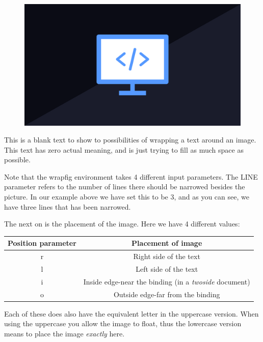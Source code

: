 \documentclass{article}
\begin{document}
\begin{figure}
    \centering
    \includegraphics[width=0.9\linewidth]{Images/Programming.png}
    \label{fig:image_wrap}
\end{figure} %

This is a blank text to show to possibilities of wrapping a text around an image. This text has zero actual meaning, and is just trying to fill 
as much space as possible. 


\vspace{4\baselineskip}
Note that the wrapfig environment takes 4 different input parameters. The LINE parameter refers to the number of lines there should be narrowed besides the picture. 
In our example above we have set this to be 3, and as you can see, we have three lines that has been narrowed.

The next on is the placement of the image. Here we have 4 different values: \\

\begin{table}[h]
    \centering
    \begin{tabular}{|c|c|} \hline
        \rowcolor{gray!30}
        Position parameter & Placement of image \\ \hline
        r & Right side of the text \\ \hline
        l & Left side of the text \\ \hline 
        i & Inside edge-near the binding (in a \textit{twoside} document) \\ \hline
        o & Outside edge-far from the binding \\ \hline
    \end{tabular}
\end{table} %
Each of these  does also have the equivalent letter in the uppercase version. When using the uppercase you allow the image to float, thus the lowercase version
means to place the image \textit{exactly} here.
\end{document}
